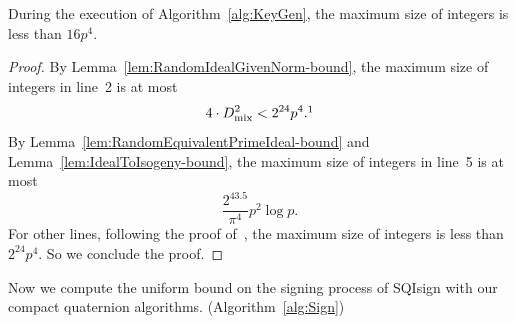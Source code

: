 \begin{theorem}
\label{thm:keygen-bound}
During the execution of Algorithm~\ref{alg:KeyGen}, the maximum size of integers is less than $16p^4$.
\end{theorem}

\begin{proof}
By Lemma~\ref{lem:RandomIdealGivenNorm-bound}, the maximum size of integers in line~2 is at most
\[ 4\cdot\Dmix^2 < 2^{24}p^4. \footnotemark \]
By Lemma~\ref{lem:RandomEquivalentPrimeIdeal-bound} and Lemma~\ref{lem:IdealToIsogeny-bound}, the maximum size of integers in line~5 is at most
\[\frac{2^{43.5}}{\pi^4}p^2\log{p}.\]
For other lines, following the proof of~\cite[Theorem~1]{KLKL25}, the maximum size of integers is less than $2^{24}p^4$.
So we conclude the proof.
\end{proof}

Now we compute the uniform bound on the signing process of SQIsign with our compact quaternion algorithms. (Algorithm~\ref{alg:Sign})

